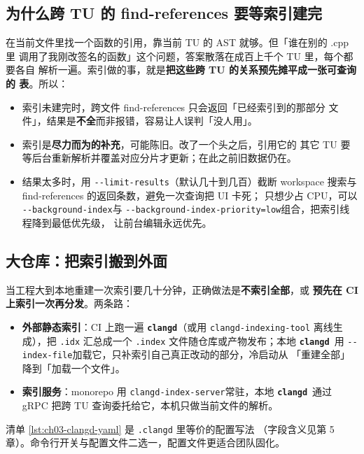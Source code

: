 \documentclass[12pt,a4paper,fontset=fandol]{ctexbook}
\newcommand{\Opt}[1]{\texttt{-\/-#1}}
\newcommand{\Bk}{\discretionary{}{}{}}
\newcommand{\Lib}[1]{\textbf{\texttt{#1}}}
\newcommand{\CD}{\Lib{clangd}}
\begin{document}
\subsection*{为什么跨 TU 的 find-references 要等索引建完}

在当前文件里找一个函数的引用，靠当前 TU 的 AST 就够。但「谁在别的 .cpp 里
调用了我刚改签名的函数」这个问题，答案散落在成百上千个 TU 里，每个都要各自
解析一遍。索引做的事，就是\textbf{把这些跨 TU 的关系预先摊平成一张可查询的
表}。所以：

\begin{itemize}
  \item 索引未建完时，跨文件 find-references 只会返回「已经索引到的那部分
        文件」，结果是\textbf{不全}而非报错，容易让人误判「没人用」。
  \item 索引是\textbf{尽力而为的补充}，可能陈旧。改了一个头之后，引用它的
        其它 TU 要等后台重新解析并覆盖对应分片才更新；在此之前旧数据仍在。
  \item 结果太多时，用 \Opt{limit-results}\Bk（默认几十到几百）截断
        workspace 搜索与 find-references 的返回条数，避免一次查询把 UI 卡死；
        只想少占 CPU，可以 \Opt{background-index}\Bk 与
        \Opt{background-index-priority=low}\Bk 组合，把索引线程降到最低优先级，
        让前台编辑永远优先。
\end{itemize}

\subsection*{大仓库：把索引搬到外面}

当工程大到本地重建一次索引要几十分钟，正确做法是\textbf{不索引全部}，或
\textbf{预先在 CI 上索引一次再分发}。两条路：

\begin{itemize}
  \item \textbf{外部静态索引}：CI 上跑一遍 \CD（或用
        \texttt{clangd-indexing-tool} 离线生成），把 \texttt{.idx} 汇总成一个
        \texttt{.index} 文件随仓库或产物发布；本地 \CD\ 用
        \Opt{index-file}\Bk 加载它，只补索引自己真正改动的部分，冷启动从
        「重建全部」降到「加载一个文件」。
  \item \textbf{索引服务}：monorepo 用
        \texttt{clangd\allowbreak-index\allowbreak-server}\Bk 常驻，本地
        \CD\ 通过 gRPC 把跨 TU 查询委托给它，本机只做当前文件的解析。
\end{itemize}

清单 \ref{lst:ch03-clangd-yaml} 是 \texttt{.clangd} 里等价的配置写法
（字段含义见第 5 章）。命令行开关与配置文件二选一，配置文件更适合团队固化。
\end{document}
